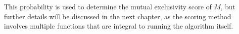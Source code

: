 This probability is used to determine the mutual exclusivity score of $M$, but further details will be discussed in the next chapter, as the scoring method involves multiple functions that are integral to running the algorithm itself.

%
%

%
%
%
%

